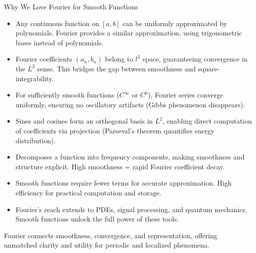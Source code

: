\begin{frame}{Why We Love Fourier for Smooth Functions}
    \begin{itemize}
        \item {} 
        Any continuous function on \([a, b]\) can be uniformly approximated by polynomials. Fourier provides a similar approximation, using trigonometric bases instead of polynomials.
        
        \item {} 
        Fourier coefficients \((a_n, b_n)\) belong to \(l^2\) space, guaranteeing convergence in the \(L^2\) sense. This bridges the gap between smoothness and square-integrability.

        \item {} 
        For sufficiently smooth functions (\(C^\infty\) or \(C^k\)), Fourier series converge uniformly, ensuring no oscillatory artifacts (Gibbs phenomenon disappears).

        \item {} 
        Sines and cosines form an orthogonal basis in \(L^2\), enabling direct computation of coefficients via projection (Parseval's theorem quantifies energy distribution).

        \item {} 
        Decomposes a function into frequency components, making smoothness and structure explicit. High smoothness = rapid Fourier coefficient decay.

        \item {} 
        Smooth functions require fewer terms for accurate approximation. High efficiency for practical computation and storage.

        \item {} 
        Fourier's reach extends to PDEs, signal processing, and quantum mechanics. Smooth functions unlock the full power of these tools.
    \end{itemize}
    \vspace{1em}
     Fourier connects smoothness, convergence, and representation, offering unmatched clarity and utility for periodic and localized phenomena.
\end{frame}

